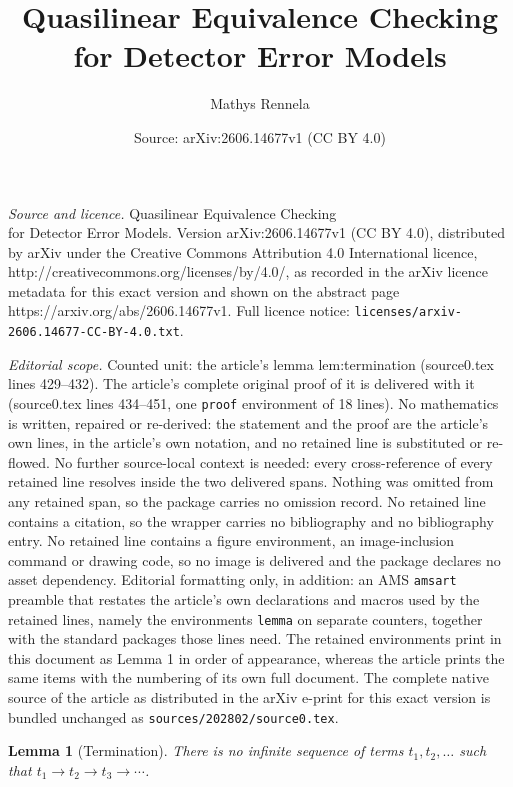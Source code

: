 \documentclass[10pt,a4paper]{amsart}
\title{Quasilinear Equivalence Checking\\ for Detector Error Models}
\author{Mathys Rennela}
\date{Source: arXiv:2606.14677v1 (CC BY 4.0)}
\newtheorem{lemma}{Lemma}
\newcommand{\tostep}{\to}
\begin{document}
\maketitle

\noindent\emph{Source and licence.} Quasilinear Equivalence Checking\\ for Detector Error Models. Version arXiv:2606.14677v1 (CC BY 4.0), distributed by arXiv under the Creative Commons Attribution 4.0 International licence, http://creativecommons.org/licenses/by/4.0/, as recorded in the arXiv licence metadata for this exact version and shown on the abstract page https://arxiv.org/abs/2606.14677v1. Full licence notice: \texttt{licenses/arxiv-2606.14677-CC-BY-4.0.txt}.\par\smallskip

\noindent\textit{Editorial scope.} Counted unit: the article's lemma lem:termination (source0.tex lines 429--432). The article's complete original proof of it is delivered with it (source0.tex lines 434--451, one \texttt{proof} environment of 18 lines). No mathematics is written, repaired or re-derived: the statement and the proof are the article's own lines, in the article's own notation, and no retained line is substituted or re-flowed.  No further source-local context is needed: every cross-reference of every retained line resolves inside the two delivered spans.  Nothing was omitted from any retained span, so the package carries no omission record.  No retained line contains a citation, so the wrapper carries no bibliography and no bibliography entry.  No retained line contains a figure environment, an image-inclusion command or drawing code, so no image is delivered and the package declares no asset dependency.  Editorial formatting only, in addition: an AMS \texttt{amsart} preamble that restates the article's own declarations and macros used by the retained lines, namely the environments \texttt{lemma} on separate counters, together with the standard packages those lines need.  The retained environments print in this document as Lemma 1 in order of appearance, whereas the article prints the same items with the numbering of its own full document.  The complete native source of the article as distributed in the arXiv e-print for this exact version is bundled unchanged as \texttt{sources/202802/source0.tex}.
\begin{lemma}[Termination]
\label{lem:termination}
There is no infinite sequence of terms $t_1, t_2, \ldots$ such that $t_1 \tostep t_2 \tostep t_3 \tostep \cdots$.
\end{lemma}
\end{document}
